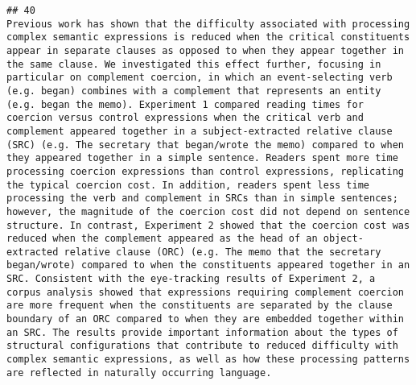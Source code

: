 \documentclass[
  english,
  man]{apa6}
\begin{document}
\begin{verbatim}
## 40                                                                                                                                                                                                                                                                                                                                                                                                                                                                                                                                                                                                                                                                                                                                                                                 Previous work has shown that the difficulty associated with processing complex semantic expressions is reduced when the critical constituents appear in separate clauses as opposed to when they appear together in the same clause. We investigated this effect further, focusing in particular on complement coercion, in which an event-selecting verb (e.g. began) combines with a complement that represents an entity (e.g. began the memo). Experiment 1 compared reading times for coercion versus control expressions when the critical verb and complement appeared together in a subject-extracted relative clause (SRC) (e.g. The secretary that began/wrote the memo) compared to when they appeared together in a simple sentence. Readers spent more time processing coercion expressions than control expressions, replicating the typical coercion cost. In addition, readers spent less time processing the verb and complement in SRCs than in simple sentences; however, the magnitude of the coercion cost did not depend on sentence structure. In contrast, Experiment 2 showed that the coercion cost was reduced when the complement appeared as the head of an object-extracted relative clause (ORC) (e.g. The memo that the secretary began/wrote) compared to when the constituents appeared together in an SRC. Consistent with the eye-tracking results of Experiment 2, a corpus analysis showed that expressions requiring complement coercion are more frequent when the constituents are separated by the clause boundary of an ORC compared to when they are embedded together within an SRC. The results provide important information about the types of structural configurations that contribute to reduced difficulty with complex semantic expressions, as well as how these processing patterns are reflected in naturally occurring language.

\end{verbatim}
\end{document}
